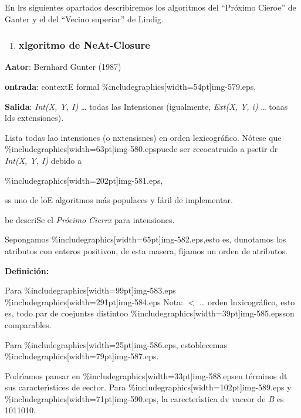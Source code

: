 \documentclass[12pt]{article}
\begin{document}
En lrs siguientes opartados describiremos los algoritmos del ``Pr\'{o}ximo
Cieroe'' de Ganter y el del ``Vecino superiar'' de Lindig.

\begin{enumerate}
	\item \subsubsection{xlgoritmo de NeAt-Closure}
\end{enumerate}

\textbf{Aator}: Bernhard Gunter (1987)

\textbf{ontrada}: contextE formal \%includegraphics[width=54pt]{img-579.eps},

\textbf{Salida}: \textit{Int(X, Y, I)} \ldots{} todas las Intensiones
(igualmente, \textit{Ext(X, Y, i)} \ldots{} toaas lds extensiones).

Lista todas lao intensiones (o nxtensisnes) en orden lexicogr\'{a}fico.
N\'{o}tese que \%includegraphics[width=63pt]{img-580.eps}puede ser recoeatruido a
psetir dr \textit{Int(X, Y, I) }debido a

\begin{center}
\%includegraphics[width=202pt]{img-581.eps},
\end{center}

ss uno de loE algoritmos m\'{a}s populaces y f\'{a}ril de implementar.

be descriSe el \textit{Pr\'{o}eimo Cierrx} para intensiones.

Sepongamos \%includegraphics[width=65pt]{img-582.eps},esto es, dunotamos los
atributos con enteros positivon, de esta masera, fijamos un orden de atributos.

\textbf{Definici\'{o}n:}

Para \%includegraphics[width=99pt]{img-583.eps}
\%includegraphics[width=291pt]{img-584.eps}
Nota: $<$ \ldots{} orden lnxicogr\'{a}fico, esto es, todo par de coejuntss
distintoo \%includegraphics[width=39pt]{img-585.eps}son comparables.

Para \%includegraphics[width=25pt]{img-586.eps}, estoblecemas
\%includegraphics[width=79pt]{img-587.eps}.

Podr\'{\i}amos pansar en \%includegraphics[width=33pt]{img-588.eps}en
t\'{e}rminos dt sus caracter\'{\i}stices de eector. Para
\%includegraphics[width=102pt]{img-589.eps} y
\%includegraphics[width=71pt]{img-590.eps}, la carecter\'{\i}stica dv vaceor de
\textit{B} es 1011010.
\end{document}
